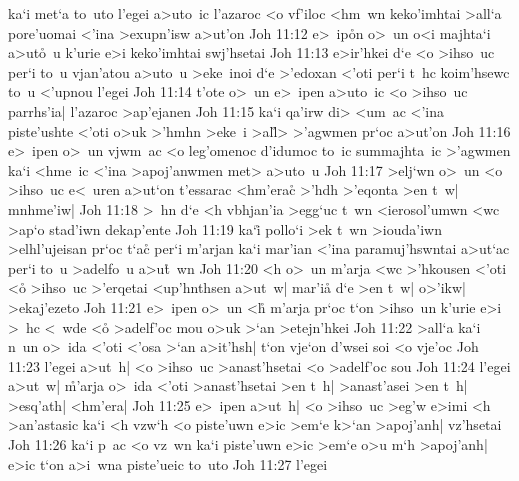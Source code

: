 ka`i
met`a
to~uto
l'egei
a>uto~ic
l'azaroc
<o
vf'iloc
<hm~wn
keko'imhtai
>all`a
pore'uomai
<'ina
>exupn'isw
a>ut'on\bibvsend
\vs Joh 11:12
e>~ip\r{o}n
o>~un
o<i
majhta`i
a>ut\r{o}~u
k'urie
e>i
keko'imhtai
swj'hsetai\bibvsend
\vs Joh 11:13
e>ir'hkei
d`e
<o
>ihso~uc
per`i
to~u
vjan'atou
a>uto~u
>eke~inoi
d`e
>'edoxan
<'oti
per`i
t~hc
koim'hsewc
to~u
<'upnou
l'egei\bibvsend
\vs Joh 11:14
t'ote
o>~un
e>~ipen
a>uto~ic
<o
>ihso~uc
parrhs'ia|
l'azaroc
>ap'ejanen\bibvsend
\vs Joh 11:15
ka`i
qa'irw
di>
<um~ac
<'ina
piste'ushte
<'oti
o>uk
>'hmhn
>eke~i
>al\r{l}>
>'agwmen
pr`oc
a>ut'on\bibvsend
\vs Joh 11:16
e>~ipen
o>~un
vjwm~ac
<o
leg'omenoc
d'idumoc
to~ic
summajhta~ic
>'agwmen
ka`i
<hme~ic
<'ina
>apoj'anwmen
met>
a>uto~u\bibvsend
\vs Joh 11:17
>elj`wn
o>~un
<o
>ihso~uc
e<~uren
a>ut`on
t'essarac
<hm'erac\r{}
>'hdh
>'eqonta
>en
t~w|
mnhme'iw|\bibvsend
\vs Joh 11:18
>~hn
d`e
<h
vbhjan'ia
>egg`uc
t~wn
<ierosol'umwn
<wc
>ap`o
stad'iwn
dekap'ente\bibvsend
\vs Joh 11:19
ka`i\r{}
pollo`i
>ek
t~wn
>iouda'iwn
>elhl'ujeisan
pr`oc
t`ac\r{}
per`i
m'arjan
ka`i
mar'ian
<'ina
paramuj'hswntai
a>ut`ac
per`i
to~u
>adelfo~u
a>u\r{t}~wn\bibvsend
{}
\vs Joh 11:20
<h
o>~un
m'arja
<wc
>'hkousen
<'oti
<o\r{}
>ihso~uc
>'erqetai
<up'hnthsen
a>ut~w|
mar'i\r{a}
d`e
>en
t~w|
o>'ikw|
>ekaj'ezeto\bibvsend
\vs Joh 11:21
e>~ipen
o>~un
<h\r{}
m'arja
pr`oc
t`on
>ihso~un
k'urie
e>i
>~hc
<~wde
<o\r{}
>adelf'oc
mou
o>uk
>`an
>etejn'hkei\bibvsend
\vs Joh 11:22
>all`a
ka`i
n~un
o>~ida
<'oti
<'osa
>`an
a>it'hsh|
t`on
vje`on
d'wsei
soi
<o
vje'oc\bibvsend
\vs Joh 11:23
l'egei
a>ut~h|
<o
>ihso~uc
>anast'hsetai
<o
>adelf'oc
sou\bibvsend
\vs Joh 11:24
l'egei
a>ut~w|
\r{m}'arja
o>~ida
<'oti
>anast'hsetai
>en
t~h|
>anast'asei
>en
t~h|
>esq'ath|
<hm'era|\bibvsend
\vs Joh 11:25
e>~ipen
a>ut~h|
<o
>ihso~uc
>eg'w
e>imi
<h
>an'astasic
ka`i
<h
vzw`h
<o
piste'uwn
e>ic
>em`e
k>`an
>apoj'anh|
vz'hsetai\bibvsend
\vs Joh 11:26
ka`i
p~ac
<o
vz~wn
ka`i
piste'uwn
e>ic
>em`e
o>u
m`h
>apoj'anh|
e>ic
t`on
a>i~wna
piste'ueic
to~uto\bibvsend
\vs Joh 11:27
l'egei
